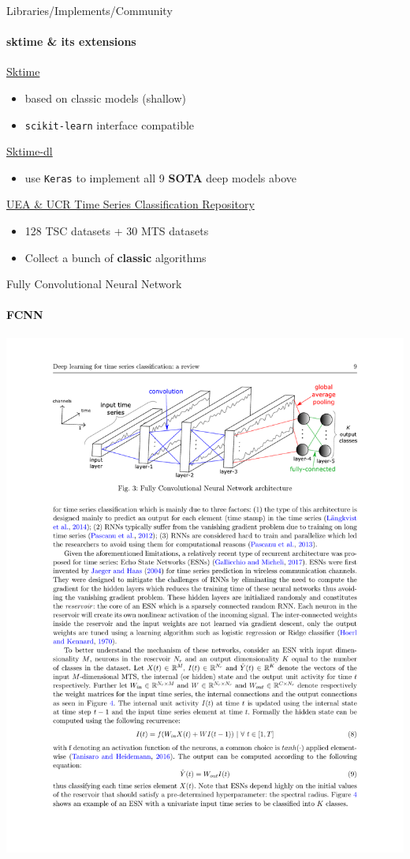 \documentclass{ctexbeamer}
\begin{document}
\begin{frame}{Libraries/Implements/Community}
  \framesubtitle{sktime \& its extensions}
  \href{https://github.com/alan-turing-institute/sktime}{\Large{Sktime}}
  \begin{itemize}
    \item based on classic models (shallow)
    \item \texttt{scikit-learn} interface compatible
  \end{itemize}
  \href{https://github.com/sktime/sktime-dl}{\Large{Sktime-dl}}
  \begin{itemize}
    \item use \texttt{Keras} to implement all 9 \textbf{SOTA} deep models above
  \end{itemize}
  \href{http://www.timeseriesclassification.com/}{\Large{UEA \& UCR Time Series Classification Repository}}
  \begin{itemize}
    \item 128 TSC datasets + 30 MTS datasets
    \item Collect a bunch of \textbf{classic} algorithms
  \end{itemize}
\end{frame}

\begin{frame}{Fully Convolutional Neural Network}
	\framesubtitle{FCNN}
	\begin{center}
		\includegraphics[width=1.05\textwidth]{figure/fcnn}
	\end{center}
\end{frame}
\end{document}
